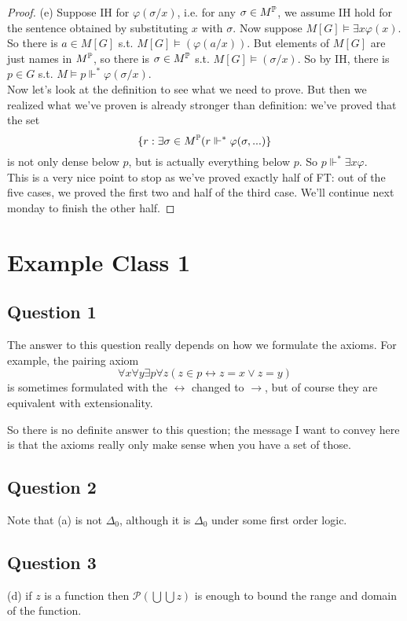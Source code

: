 \documentclass[a4paper]{article}
\begin{document}
\begin{proof}
(e) Suppose IH for $\varphi(\sigma/x)$, i.e. for any $\sigma \in M^\P$, we assume IH hold for the sentence obtained by substituting $x$ with $\sigma$. Now suppose $M[G] \vDash \exists x \varphi(x)$. So there is $a \in M[G]$ s.t. $M[G] \vDash(\varphi(a/x))$. But elements of $M[G]$ are just names in $M^\P$, so there is $\sigma \in M^\P$ s.t. $M[G] \vDash(\sigma/x)$. So by IH, there is $p \in G$ s.t. $M \vDash p \Vdash^* \varphi(\sigma/x)$.\\
Now let's look at the definition to see what we need to prove. But then we realized what we've proven is already stronger than definition: we've proved that the set
\[
\{r: \exists \sigma \in M^\P (r \Vdash^* \varphi(\sigma,...)\}
\]
is not only dense below $p$, but is actually everything below $p$. So $p \Vdash^* \exists x \varphi$.\\
This is a very nice point to stop as we've proved exactly half of FT: out of the five cases, we proved the first two and half of the third case. We'll continue next monday to finish the other half.
\end{proof}

\newpage

\section{Example Class 1}

\subsection{Question 1}

The answer to this question really depends on how we formulate the axioms. For example, the pairing axiom
\[
    \forall x \forall y \exists p \forall z (z \in p \leftrightarrow z = x \vee z = y)
\]
is sometimes formulated with the $\leftrightarrow$ changed to $\to$, but of course they are equivalent with extensionality.

So there is no definite answer to this question; the message I want to convey here is that the axioms really only make sense when you have a set of those.

\subsection{Question 2}
Note that (a) is not $\Delta_0$, although it is $\Delta_0$ under some first order logic.

\subsection{Question 3}
(d) if $z$ is a function then $\mathcal{P}(\bigcup\bigcup z)$ is enough to bound the range and domain of the function.
\end{document}
